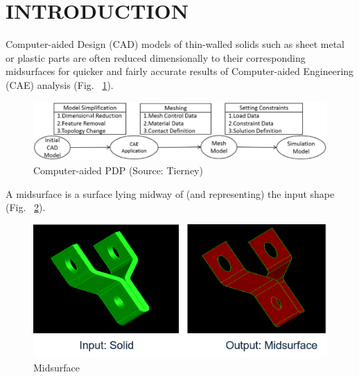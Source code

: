 \documentclass[9pt,academicons]{article}
\begin{document}
%






\section{INTRODUCTION}
Computer-aided Design (CAD) models of thin-walled solids such as sheet metal or plastic parts are often reduced dimensionally to their corresponding midsurfaces for quicker and fairly accurate results of Computer-aided Engineering (CAE) analysis (Fig. ~\ref{fig_cadcaeworkflow}).  

	\begin{figure} [!h]
		\centering
		\includegraphics[width=0.9\linewidth,keepaspectratio]{images/midcurve2}
		\caption{Computer-aided PDP (Source: Tierney\cite{Tierney2013})}
		\label{fig_cadcaeworkflow}
	\end{figure}
	

A midsurface is a surface lying midway of (and representing) the input shape (Fig. ~\ref{fig_midsurface}).  

	\begin{figure} [!h]
		\centering
		\includegraphics[width=0.8\linewidth,keepaspectratio]{images/midcurve5}
		\caption{Midsurface}
		\label{fig_midsurface}
	\end{figure}
\end{document}
